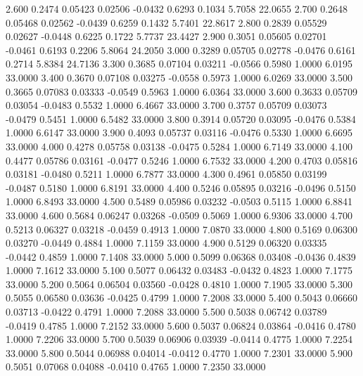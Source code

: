    2.600   0.2474   0.05423   0.02506  -0.0432   0.6293   0.1034   5.7058  22.0655
   2.700   0.2648   0.05468   0.02562  -0.0439   0.6259   0.1432   5.7401  22.8617
   2.800   0.2839   0.05529   0.02627  -0.0448   0.6225   0.1722   5.7737  23.4427
   2.900   0.3051   0.05605   0.02701  -0.0461   0.6193   0.2206   5.8064  24.2050
   3.000   0.3289   0.05705   0.02778  -0.0476   0.6161   0.2714   5.8384  24.7136
   3.300   0.3685   0.07104   0.03211  -0.0566   0.5980   1.0000   6.0195  33.0000
   3.400   0.3670   0.07108   0.03275  -0.0558   0.5973   1.0000   6.0269  33.0000
   3.500   0.3665   0.07083   0.03333  -0.0549   0.5963   1.0000   6.0364  33.0000
   3.600   0.3633   0.05709   0.03054  -0.0483   0.5532   1.0000   6.4667  33.0000
   3.700   0.3757   0.05709   0.03073  -0.0479   0.5451   1.0000   6.5482  33.0000
   3.800   0.3914   0.05720   0.03095  -0.0476   0.5384   1.0000   6.6147  33.0000
   3.900   0.4093   0.05737   0.03116  -0.0476   0.5330   1.0000   6.6695  33.0000
   4.000   0.4278   0.05758   0.03138  -0.0475   0.5284   1.0000   6.7149  33.0000
   4.100   0.4477   0.05786   0.03161  -0.0477   0.5246   1.0000   6.7532  33.0000
   4.200   0.4703   0.05816   0.03181  -0.0480   0.5211   1.0000   6.7877  33.0000
   4.300   0.4961   0.05850   0.03199  -0.0487   0.5180   1.0000   6.8191  33.0000
   4.400   0.5246   0.05895   0.03216  -0.0496   0.5150   1.0000   6.8493  33.0000
   4.500   0.5489   0.05986   0.03232  -0.0503   0.5115   1.0000   6.8841  33.0000
   4.600   0.5684   0.06247   0.03268  -0.0509   0.5069   1.0000   6.9306  33.0000
   4.700   0.5213   0.06327   0.03218  -0.0459   0.4913   1.0000   7.0870  33.0000
   4.800   0.5169   0.06300   0.03270  -0.0449   0.4884   1.0000   7.1159  33.0000
   4.900   0.5129   0.06320   0.03335  -0.0442   0.4859   1.0000   7.1408  33.0000
   5.000   0.5099   0.06368   0.03408  -0.0436   0.4839   1.0000   7.1612  33.0000
   5.100   0.5077   0.06432   0.03483  -0.0432   0.4823   1.0000   7.1775  33.0000
   5.200   0.5064   0.06504   0.03560  -0.0428   0.4810   1.0000   7.1905  33.0000
   5.300   0.5055   0.06580   0.03636  -0.0425   0.4799   1.0000   7.2008  33.0000
   5.400   0.5043   0.06660   0.03713  -0.0422   0.4791   1.0000   7.2088  33.0000
   5.500   0.5038   0.06742   0.03789  -0.0419   0.4785   1.0000   7.2152  33.0000
   5.600   0.5037   0.06824   0.03864  -0.0416   0.4780   1.0000   7.2206  33.0000
   5.700   0.5039   0.06906   0.03939  -0.0414   0.4775   1.0000   7.2254  33.0000
   5.800   0.5044   0.06988   0.04014  -0.0412   0.4770   1.0000   7.2301  33.0000
   5.900   0.5051   0.07068   0.04088  -0.0410   0.4765   1.0000   7.2350  33.0000

